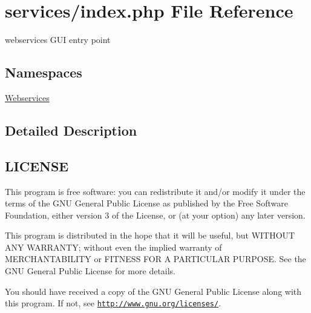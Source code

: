 \hypertarget{services_2index_8php}{}\section{services/index.php File Reference}
\label{services_2index_8php}


webservices G\+UI entry point  


\subsection*{Namespaces}
\begin{DoxyCompactItemize}
\item 
 \hyperlink{namespace_webservices}{Webservices}
\end{DoxyCompactItemize}


\subsection{Detailed Description}
\hypertarget{services_2index_8php_LICENSE}{}\subsection{L\+I\+C\+E\+N\+SE}\label{services_2index_8php_LICENSE}
This program is free software\+: you can redistribute it and/or modify it under the terms of the G\+NU General Public License as published by the Free Software Foundation, either version 3 of the License, or (at your option) any later version.

This program is distributed in the hope that it will be useful, but W\+I\+T\+H\+O\+UT A\+NY W\+A\+R\+R\+A\+N\+TY; without even the implied warranty of M\+E\+R\+C\+H\+A\+N\+T\+A\+B\+I\+L\+I\+TY or F\+I\+T\+N\+E\+SS F\+OR A P\+A\+R\+T\+I\+C\+U\+L\+AR P\+U\+R\+P\+O\+SE. See the G\+NU General Public License for more details.

You should have received a copy of the G\+NU General Public License along with this program. If not, see \href{http://www.gnu.org/licenses/}{\tt http\+://www.\+gnu.\+org/licenses/}. 